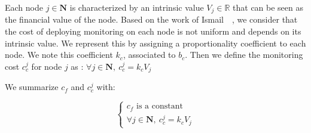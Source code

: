 Each node $j \in \textbf{N}$ is characterized by an intrinsic value $V_j \in \mathbb{R}$ that can be seen as the financial value of the node.
Based on the work of Ismail~\etal~\cite{interdep-ismail2017}, we consider that the cost of deploying monitoring on each node is not uniform and depends on its intrinsic value. We represent this by assigning a proportionality coefficient to each node.
We note this coefficient $k_{c}$, associated to $b_c$.
Then we define the monitoring cost $c_c^j$ for node $j$ as : $\forall j \in \textbf{N},~ c_c^j = k_c  V_j$ 

We summarize $c_f$ and $c_c^j$ with:

\begin{equation}
  \begin{cases}
    c_f\text{ is a constant}\\
  \forall j \in \textbf{N},~ c_c^j = k_c  V_j 
  \end{cases}
\end{equation}

